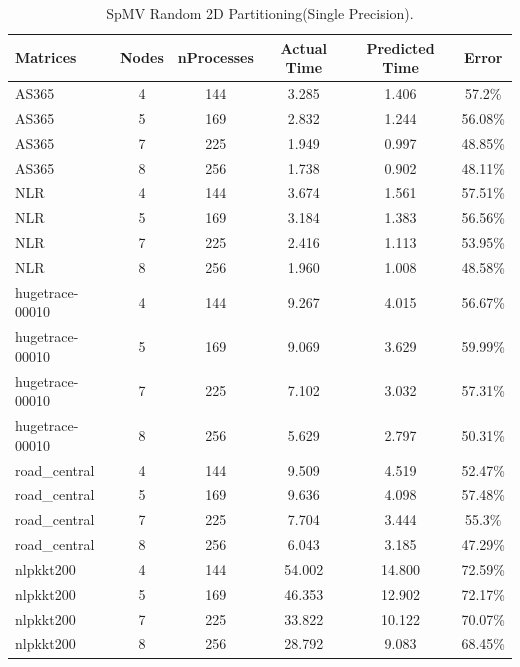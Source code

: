 \documentclass[conference, 10ppt]{IEEEtran}
\begin{document}
\begin{table}[htb]
\caption{SpMV Random 2D Partitioning(Single Precision).}
\label{tab:spmv-2d-single}
\centering
\begin{tabular}[c]{| l | c | c | c | c | c |}
\hline
Matrices & Nodes & nProcesses & Actual Time & Predicted Time & Error \\ \hline
AS365 & 4 & 144 & 3.285 & 1.406 & 57.2\% \\ \hline
AS365 & 5 & 169 & 2.832 & 1.244 & 56.08\% \\ \hline
AS365 & 7 & 225 & 1.949 & 0.997 & 48.85\% \\ \hline
AS365 & 8 & 256 & 1.738 & 0.902 & 48.11\% \\ \hline
NLR & 4 & 144 & 3.674 & 1.561 & 57.51\% \\ \hline
NLR & 5 & 169 & 3.184 & 1.383 & 56.56\% \\ \hline
NLR & 7 & 225 & 2.416 & 1.113 & 53.95\% \\ \hline
NLR & 8 & 256 & 1.960 & 1.008 & 48.58\% \\ \hline
hugetrace-00010 & 4 & 144 & 9.267 & 4.015 & 56.67\% \\ \hline
hugetrace-00010 & 5 & 169 & 9.069 & 3.629 & 59.99\% \\ \hline
hugetrace-00010 & 7 & 225 & 7.102 & 3.032 & 57.31\% \\ \hline
hugetrace-00010 & 8 & 256 & 5.629 & 2.797 & 50.31\% \\ \hline
road\_central & 4 & 144 & 9.509 & 4.519 & 52.47\% \\ \hline
road\_central & 5 & 169 & 9.636 & 4.098 & 57.48\% \\ \hline
road\_central & 7 & 225 & 7.704 & 3.444 & 55.3\% \\ \hline
road\_central & 8 & 256 & 6.043 & 3.185 & 47.29\% \\ \hline
nlpkkt200 & 4 & 144 & 54.002 & 14.800 & 72.59\% \\ \hline
nlpkkt200 & 5 & 169 & 46.353 & 12.902 & 72.17\% \\ \hline
nlpkkt200 & 7 & 225 & 33.822 & 10.122 & 70.07\% \\ \hline
nlpkkt200 & 8 & 256 & 28.792 & 9.083 & 68.45\% \\ \hline



\end{tabular}
\end{table}
\end{document}
